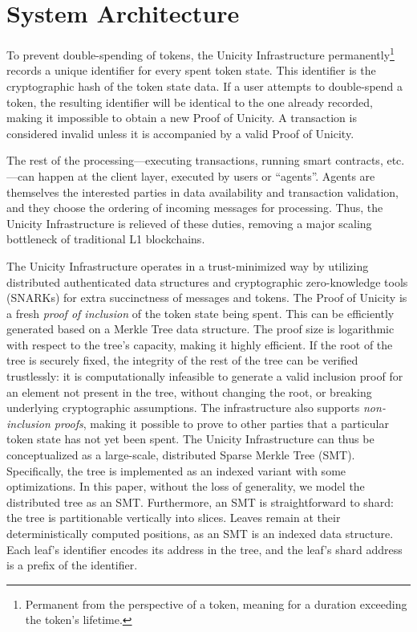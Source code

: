 \documentclass[twocolumn]{article}
\begin{document}




\section{System Architecture}

To prevent double-spending of tokens, the Unicity Infrastructure permanently\footnote{Permanent from the perspective of a token, meaning for a duration exceeding the token's lifetime.} records a unique identifier for every spent token state. This identifier is the cryptographic hash of the token state data. If a user attempts to double-spend a token, the resulting identifier will be identical to the one already recorded, making it impossible to obtain a new Proof of Unicity. A transaction is considered invalid unless it is accompanied by a valid Proof of Unicity.

The rest of the processing---executing transactions, running smart contracts, etc.---can happen at the client layer, executed by users or ``agents''. Agents are themselves the interested parties in data availability and transaction validation, and they choose the ordering of incoming messages for processing. Thus, the Unicity Infrastructure is relieved of these duties, removing a major scaling bottleneck of traditional L1 blockchains.

The Unicity Infrastructure operates in a trust-minimized way by utilizing distributed authenticated data structures and cryptographic zero-knowledge tools (SNARKs) for extra succinctness of messages and tokens. The Proof of Unicity is a fresh \emph{proof of inclusion} of the token state being spent. This can be efficiently generated based on a Merkle Tree data structure. The proof size is logarithmic with respect to the tree's capacity, making it highly efficient. If the root of the tree is securely fixed, the integrity of the rest of the tree can be verified trustlessly: it is computationally infeasible to generate a valid inclusion proof for an element not present in the tree, without changing the root, or breaking underlying cryptographic assumptions. The infrastructure also supports \textit{non-inclusion proofs}, making it possible to prove to other parties that a particular token state has not yet been spent. The Unicity Infrastructure can thus be conceptualized as a large-scale, distributed Sparse Merkle Tree (SMT). Specifically, the tree is implemented as an indexed variant with some optimizations. In this paper, without the loss of generality, we model the distributed tree as an SMT. Furthermore, an SMT is straightforward to shard: the tree is partitionable vertically into slices. Leaves remain at their deterministically computed positions, as an SMT is an indexed data structure. Each leaf's identifier encodes its address in the tree, and the leaf's shard address is a prefix of the identifier.
\end{document}
